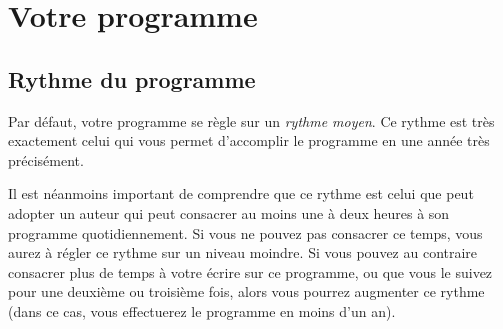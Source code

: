 \chapter{Votre programme} %
\label{cha:votre_programme}

\section{Rythme du programme} %
\label{sec:rythme_du_programme}

Par défaut, votre programme se règle sur un \emph{rythme moyen}. Ce rythme est très exactement celui qui vous permet d'accomplir le programme en une année très précisément.

Il est néanmoins important de comprendre que ce rythme est celui que peut adopter un auteur qui peut consacrer au moins une à deux heures à son programme quotidiennement. Si vous ne pouvez pas consacrer ce temps, vous aurez à régler ce rythme sur un niveau moindre. Si vous pouvez au contraire consacrer plus de temps à votre écrire sur ce programme, ou que vous le suivez pour une deuxième ou troisième fois, alors vous pourrez augmenter ce rythme (dans ce cas, vous effectuerez le programme en moins d'un an).
 
